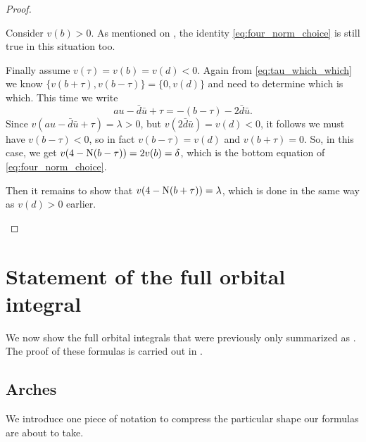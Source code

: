 \begin{proof}
\begin{itemize}
  \ii Consider $v(b) > 0$.
  As mentioned on \cite[p.\ 242]{ref:AFL}, the identity \eqref{eq:four_norm_choice}
  is still true in this situation too.

  \ii Finally assume $v(\tau) = v(b) = v(d) < 0$.
  Again from \eqref{eq:tau_which_which}
  we know $\{v(b+\tau), v(b-\tau)\} = \{0, v(d)\}$ and need to determine which is which.
  This time we write
  \[ au - \bar d \bar u + \tau = -(b - \tau) - 2 \bar d \bar u. \]
  Since $v(au - \bar d \bar u + \tau) = \lambda > 0$,
  but $v(2 \bar d \bar u) = v(d) < 0$,
  it follows we must have $v(b-\tau) < 0$,
  so in fact $v(b-\tau) = v(d)$ and $v(b+\tau) = 0$.
  So, in this case, we get $v(4 - \operatorname{N}(b-\tau)) = 2v(b) = \delta$,
  which is the bottom equation of \eqref{eq:four_norm_choice}.

  Then it remains to show that $v(4-\operatorname{N}(b+\tau)) = \lambda$,
  which is done in the same way as $v(d) > 0$ earlier.
  \qedhere
  \end{itemize}
\end{proof}
\section{Statement of the full orbital integral}
We now show the full orbital integrals that were previously only summarized as .
The proof of these formulas is carried out in .
\subsection{Arches}
We introduce one piece of notation to compress the particular shape our formulas are about to take.

